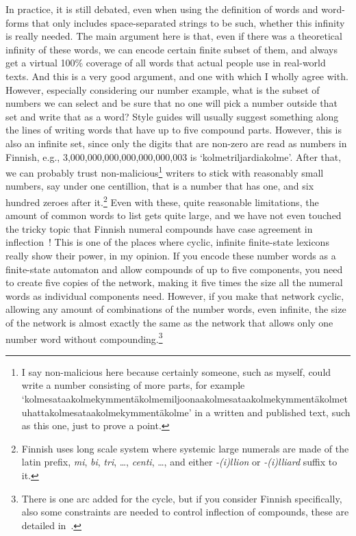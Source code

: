\documentclass[officiallayout,final]{unihelcompling}
\begin{document}
In practice, it is still debated, even when using the definition of words and
word-forms that only includes space-separated strings to be such, whether this
infinity is really needed. The main argument here is that, even if there was a
theoretical infinity of these words, we can encode certain finite subset of
them, and always get a virtual 100\% coverage of all words that actual people
use in real-world texts. And this is a very good argument, and one with which I
wholly agree with. However, especially considering our number example, what is
the subset of numbers we can select and be sure that no one will pick a number
outside that set and write that as a word? Style guides will usually suggest
something along the lines of writing words that have up to five compound parts.
However, this is also an infinite set, since only the digits that are non-zero
are read as numbers in Finnish, e.g., 3,000,000,000,000,000,000,003 is
`kolmetriljardiakolme'. After that, we can probably trust
non-malicious\footnote{I say non-malicious here because certainly someone, such
    as myself, could write a number consisting of more parts, for example
    `kolmesataakolmekymmentäkolmemiljoonaakolmesataakolmekymmentäkolmetuhattakolmesataakolmekymmentäkolme'
    in a written and published text, such as this one, just to prove a point.}
    writers to stick with reasonably small numbers, say under one centillion,
    that is a number that has one, and six hundred zeroes after
    it.\footnote{Finnish uses long scale system where systemic large numerals
    are made of the latin prefix, \emph{mi}, \emph{bi}, \emph{tri}, \ldots,
\emph{centi}, \ldots, and either \emph{-(i)llion} or \emph{-(i)lliard} suffix
to it.} Even with these, quite reasonable limitations, the amount of common
words to list gets quite large, and we have not even touched the tricky topic
that Finnish numeral compounds have case agreement in
inflection~\citep{karttunen2006numbers}! This is one of the places where
cyclic, infinite finite-state lexicons really show their power, in my opinion.
If you encode these number words as a \gls{finite-state automaton} and allow
compounds of up to five components, you need to create five copies of the
network, making it five times the size all the numeral words as individual
components need.  However, if you make that network cyclic, allowing any amount
of combinations of the number words, even infinite, the size of the network is
almost exactly the same as the network that allows only one number word without
compounding.\footnote{There is one arc added for the cycle, but if you consider
Finnish specifically, also some constraints are needed to control inflection of
compounds, these are detailed in~\citet{karttunen2006numbers}.}
\end{document}
